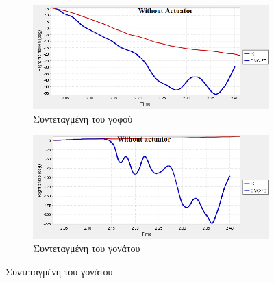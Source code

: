 \begin{figure}[H]
    \centering
    \begin{subfigure}[t]{.48\textwidth}
        \includegraphics[width=\textwidth, keepaspectratio]{fig/hip-ik-cmc-na.png}
        \caption{Συντεταγμένη του γοφού}
        \label{fig:hip-cmc-na}
    \end{subfigure}
    \begin{subfigure}[t]{.48\textwidth}
        \includegraphics[width=\textwidth, keepaspectratio]{fig/ankle-ik-cmc-na.png}
        \caption{Συντεταγμένη του γονάτου}
        \label{fig:knee-cmc-na}
    \end{subfigure}


\end{figure}
